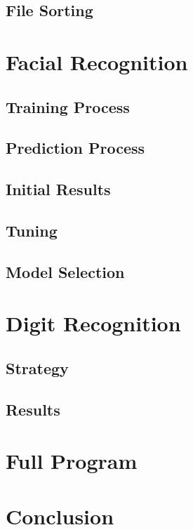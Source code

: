 \documentclass[11pt]{article}
\begin{document}
\subsection{File Sorting}

\section{Facial Recognition}
\subsection{Training Process}
\subsection{Prediction Process}
\subsection{Initial Results}
\subsection{Tuning}
\subsection{Model Selection}
\section{Digit Recognition}
\subsection{Strategy}
\subsection{Results}
\section{Full Program}
\section{Conclusion}
\end{document}
